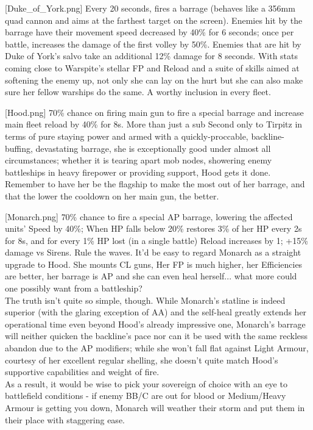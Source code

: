 [Duke_of_York.png]
{Every 20 seconds, fires a barrage (behaves like a 356mm quad cannon and aims at the farthest target on the screen). Enemies hit by the barrage have their movement speed decreased by 40\% for 6 seconds; once per battle, increases the damage of the first volley by 50\%. Enemies that are hit by Duke of York's salvo take an additional 12\% damage for 8 seconds.}
{}
{With stats coming close to Warspite's stellar FP and Reload and a suite of skills aimed at softening the enemy up, not only she can lay on the hurt but she can also make sure her fellow warships do the same. A worthy inclusion in every fleet.}

[Hood.png]
{ 70\% chance on firing main gun to fire a special barrage and increase main fleet reload by 40\% for 8s.}
{More than just a sub}
{Second only to Tirpitz in terms of pure staying power and armed with a quickly-proccable, backline-buffing, devastating barrage, she is exceptionally good under almost all circumstances; whether it is tearing apart mob nodes, showering enemy battleships in heavy firepower or providing support, Hood gets it done.\\
Remember to have her be the flagship to make the most out of her barrage, and that the lower the cooldown on her main gun, the better.}

[Monarch.png]
{70\% chance to fire a special AP barrage, lowering the affected units' Speed by 40\%; When HP falls below 20\% restores 3\% of her HP every 2s for 8s, and for every 1\% HP lost (in a single battle) Reload increases by 1; +15\% damage vs Sirens.}
{Rule the waves.}
{It'd be easy to regard Monarch as a straight upgrade to Hood. She mounts CL guns, Her FP is much higher, her Efficiencies are better, her barrage is AP and she can even heal herself... what more could one possibly want from a battleship?\\
The truth isn't quite so simple, though. While Monarch's statline is indeed superior (with the glaring exception of AA) and the self-heal greatly extends her operational time even beyond Hood's already impressive one, Monarch's barrage will neither quicken the backline's pace nor can it be used with the same reckless abandon due to the AP modifiers; while she won't fall flat against Light Armour, courtesy of her excellent regular shelling, she doesn't quite match Hood's supportive capabilities and weight of fire.\\
As a result, it would be wise to pick your sovereign of choice with an eye to battlefield conditions - if enemy BB/C are out for blood or Medium/Heavy Armour is getting you down, Monarch will weather their storm and put them in their place with staggering ease.}

